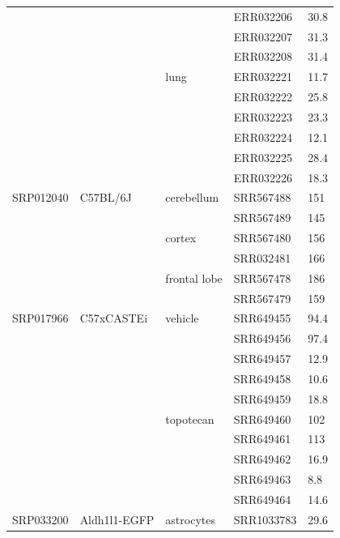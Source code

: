 \begin{longtabu} {X[0.9,c]X[1.1,l]X[1.2,l]X[1,l]X[1,c]}
            &            &              & ERR032206 & 30.8\\
            &            &              & ERR032207 & 31.3\\
            &            &              & ERR032208 & 31.4\\
            &            & lung         & ERR032221 & 11.7\\
            &            &              & ERR032222 & 25.8\\
            &            &              & ERR032223 & 23.3\\
            &            &              & ERR032224 & 12.1\\
            &            &              & ERR032225 & 28.4\\
            &            &              & ERR032226 & 18.3\\
  \midrule
  SRP012040 & C57BL/6J   & cerebellum   & SRR567488 & 151 \\
            &            &              & SRR567489 & 145 \\
            &            & cortex       & SRR567480 & 156 \\
            &            &              & SRR032481 & 166 \\
            &            & frontal lobe & SRR567478 & 186 \\
            &            &              & SRR567479 & 159 \\
  \midrule
  SRP017966 & C57xCASTEi & vehicle      & SRR649455 & 94.4\\
            &            &              & SRR649456 & 97.4\\
            &            &              & SRR649457 & 12.9\\
            &            &              & SRR649458 & 10.6\\
            &            &              & SRR649459 & 18.8\\
            &            & topotecan    & SRR649460 & 102 \\
            &            &              & SRR649461 & 113 \\
            &            &              & SRR649462 & 16.9\\
            &            &              & SRR649463 & 8.8 \\
            &            &              & SRR649464 & 14.6\\
  \midrule
  SRP033200 & Aldh1l1-EGFP & astrocytes  & SRR1033783 & 29.6\\

\end{longtabu}
